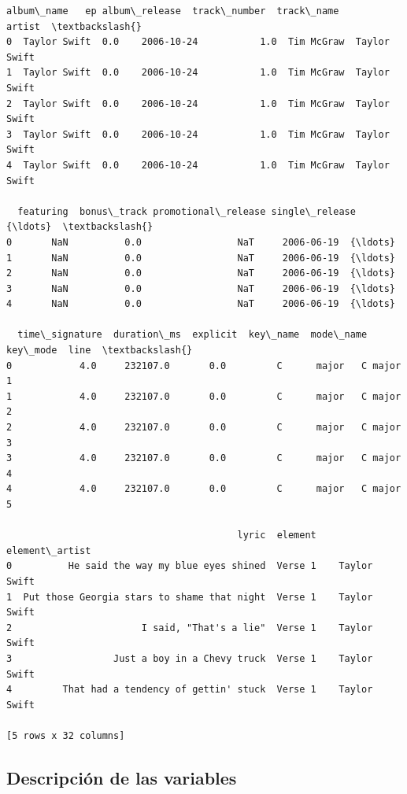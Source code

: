 \documentclass[11pt]{article}
\makeatletter
\newcommand{\boxspacing}{\kern\kvtcb@left@rule\kern\kvtcb@boxsep}
\newcommand{\prompt}[4]{
        {\ttfamily\llap{{\color{#2}[#3]:\hspace{3pt}#4}}\vspace{-\baselineskip}}
    }
\makeatother
\begin{document}
            \begin{tcolorbox}[breakable, size=fbox, boxrule=.5pt, pad at break*=1mm, opacityfill=0]
\prompt{Out}{outcolor}{66}{\boxspacing}
\begin{Verbatim}[commandchars=\\\{\}]
     album\_name   ep album\_release  track\_number  track\_name        artist  \textbackslash{}
0  Taylor Swift  0.0    2006-10-24           1.0  Tim McGraw  Taylor Swift
1  Taylor Swift  0.0    2006-10-24           1.0  Tim McGraw  Taylor Swift
2  Taylor Swift  0.0    2006-10-24           1.0  Tim McGraw  Taylor Swift
3  Taylor Swift  0.0    2006-10-24           1.0  Tim McGraw  Taylor Swift
4  Taylor Swift  0.0    2006-10-24           1.0  Tim McGraw  Taylor Swift

  featuring  bonus\_track promotional\_release single\_release  {\ldots}  \textbackslash{}
0       NaN          0.0                 NaT     2006-06-19  {\ldots}
1       NaN          0.0                 NaT     2006-06-19  {\ldots}
2       NaN          0.0                 NaT     2006-06-19  {\ldots}
3       NaN          0.0                 NaT     2006-06-19  {\ldots}
4       NaN          0.0                 NaT     2006-06-19  {\ldots}

  time\_signature  duration\_ms  explicit  key\_name  mode\_name  key\_mode  line  \textbackslash{}
0            4.0     232107.0       0.0         C      major   C major     1
1            4.0     232107.0       0.0         C      major   C major     2
2            4.0     232107.0       0.0         C      major   C major     3
3            4.0     232107.0       0.0         C      major   C major     4
4            4.0     232107.0       0.0         C      major   C major     5

                                         lyric  element  element\_artist
0          He said the way my blue eyes shined  Verse 1    Taylor Swift
1  Put those Georgia stars to shame that night  Verse 1    Taylor Swift
2                       I said, "That's a lie"  Verse 1    Taylor Swift
3                  Just a boy in a Chevy truck  Verse 1    Taylor Swift
4         That had a tendency of gettin' stuck  Verse 1    Taylor Swift

[5 rows x 32 columns]
\end{Verbatim}
\end{tcolorbox}
        
    \hypertarget{descripciuxf3n-de-las-variables}{%
\subsection{Descripción de las
variables}\label{descripciuxf3n-de-las-variables}}
\end{document}
